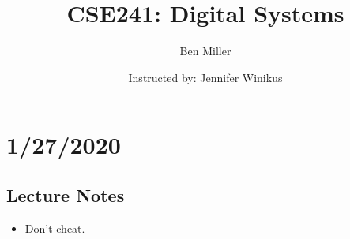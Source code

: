 \documentclass[10pt,a4paper]{article}
\title{CSE241: Digital Systems}
\author{Ben Miller}
\date{Instructed by: Jennifer Winikus}
\newcommand\blankpage{%
    \null
    \thispagestyle{empty}%
    \addtocounter{page}{-1}%
    \newpage}
\begin{document}
\maketitle 
\afterpage{\blankpage}
\thispagestyle{empty}
\clearpage
{}
\pagebreak
\cleardoublepage
{}
\tableofcontents
\cleardoublepage
{}
\pagebreak
\section{1/27/2020}
\subsection{Lecture Notes}
\begin{itemize}
\item Don't cheat. 
\end{itemize}
\end{document}
